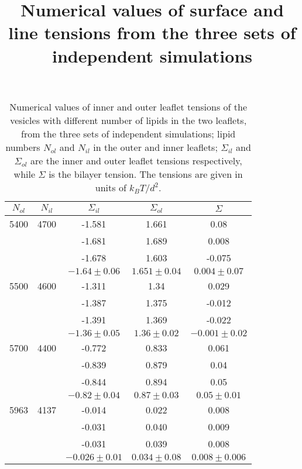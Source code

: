 \documentclass{article}
\title{Numerical  values of surface and line tensions from the three sets of independent simulations}
\begin{document}
\maketitle

\newpage

\begin{table}
    \centering
    \caption{Numerical  values of inner and outer leaflet tensions of the vesicles with different number of lipids in the two leaflets, from the three sets of independent simulations; 
    lipid numbers $N_{ol}$ and $N_{il}$ in the outer and inner leaflets; $\Sigma_{il}$ and $\Sigma_{ol}$ are the inner and outer leaflet tensions respectively, while $\Sigma$ is the bilayer tension. The tensions are given in units of $k_B T/d^2$.}
    \begin{tabular}{|c|c|c|c|c|}
    \hline
     $N_{ol}$ & $N_{il}$   & $\Sigma_{il}$ & $\Sigma_{ol}$ & $\Sigma$ \\
     \hline
      5400    &  4700      &  -1.581       &   1.661       &    0.08     \\
              &            &  -1.681       &   1.689       &    0.008    \\
              &            &  -1.678       &   1.603       &   -0.075    \\
  \hline
              &       &  $-1.64 \pm 0.06$ &  $1.651 \pm 0.04$  &    $0.004 \pm 0.07$ \\
  \hline
              
      5500    &  4600      &  -1.311      &   1.34       &     0.029     \\
              &            &  -1.387      &   1.375      &    -0.012     \\
              &            &  -1.391      &   1.369      &    -0.022     \\
    \hline
              &            & $-1.36 \pm 0.05$  & $1.36 \pm 0.02$ & $-0.001 \pm 0.02$ \\
    \hline
      5700    &  4400      & -0.772       &    0.833     &     0.061      \\
              &            & -0.839       &    0.879     &     0.04       \\
              &            & -0.844       &    0.894     &     0.05       \\
    \hline
              &            & $-0.82 \pm 0.04$  &  $0.87 \pm 0.03$  &  $0.05 \pm 0.01$ \\
    \hline

    5963      &  4137      & -0.014       &   0.022      &    0.008      \\
              &            & -0.031       &   0.040      &    0.009      \\
              &            & -0.031       &   0.039      &    0.008       \\
    \hline
            &            & $-0.026 \pm 0.01$   & $0.034 \pm 0.08$  &  $0.008 \pm 0.006$ \\
    \hline
    
     \end{tabular}
\end{table}


     
\end{document}
